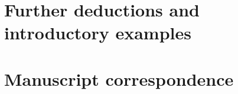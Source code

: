 \section{Further deductions and introductory examples}


\section{Manuscript correspondence}
\printmapping

